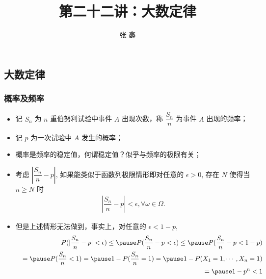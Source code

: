 \title[概率论]{第二十二讲：大数定律}
\author[张鑫{\rm Email: x.zhang.seu@foxmail.com} ]{\large 张 鑫}
\date{}


{ 
	\begin{frame}
		\titlepage
	\end{frame}
}

\subsection{大数定律}
\begin{frame}
	\frametitle{概率及频率}
	\begin{itemize}[<+-|alert@+>]
		\item 记 $S_n$ 为 $n$ 重伯努利试验中事件 $A$ 出现次数，称 $\dfrac{S_n}{n}$ 为事件 $A$ 出现的频率；
		\item 记 $p$ 为一次试验中 $A$ 发生的概率；
		\item 概率是频率的稳定值，何谓稳定值？似乎与频率的极限有关；
		\item 考虑 $|\dfrac{S_n}{n}-p|$, 如果能类似于函数列极限情形即对任意的 $\epsilon>0$, 存在 $N$ 使得当 $n\ge N$ 时
		\begin{eqnarray*}
			|\dfrac{S_n}{n}-p|< \epsilon, \forall \omega\in \Omega.
		\end{eqnarray*}
		\item 但是上述情形无法做到，事实上，对任意的 $\epsilon<1-p$,
		\begin{eqnarray*}
			&& P(|\dfrac{S_n}{n}-p|< \epsilon)\le \pause P(\dfrac{S_n}{n}-p<\epsilon)\le \pause P(\dfrac{S_n}{n}-p<1-p)\\
			&&=\pause P(\frac{S_n}{n}<1)=\pause 1-P(\frac{S_n}{n}=1)=\pause 1-P(X_1=1,\cdots,X_n=1)\\
			&&=\pause 1-p^n<1
		\end{eqnarray*}
	\end{itemize}
\end{frame}
